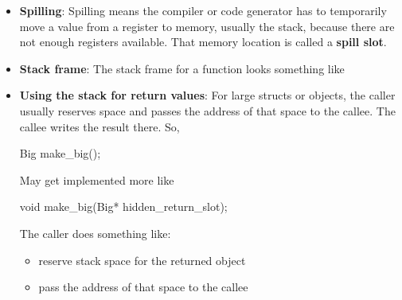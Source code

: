 \documentclass{report}
\begin{document}
\begin{itemize}
                \begin{enumerate}
                    \item Push rbp onto the stack
                    \item \texttt{mov rbp, rsp}
                    \item Make room for local vars (\texttt{sub rsp, k})
                    \item Initialize local vars
                \end{enumerate}
                Epilogue:
                \begin{enumerate}
                    \item \texttt{mov rsp, rbp}
                    \item \texttt{pop rbp}
                    \item \texttt{ret}
                \end{enumerate}
            \item \textbf{Spilling}: Spilling means the compiler or code generator has to temporarily move a value from a register to memory, usually the stack, because there are not enough registers available. That memory location is called a \textbf{spill slot}.
            \item \textbf{Stack frame}: The stack frame for a function looks something like
                \bigbreak \noindent 
            \item \textbf{Using the stack for return values}: For large structs or objects, the caller usually reserves space and passes the address of that space to the callee. The callee writes the result there. So,
                \bigbreak \noindent 
                \begin{cppcode}
                Big make_big();
                \end{cppcode}
                \bigbreak \noindent 
                May get implemented more like
                \bigbreak \noindent 
                \begin{cppcode}
                void make_big(Big* hidden_return_slot);
                \end{cppcode}
                \bigbreak \noindent 
                The caller does something like:
                \begin{itemize}
                    \item reserve stack space for the returned object
                    \item pass the address of that space to the callee

\end{itemize}
\end{itemize}
\end{document}
